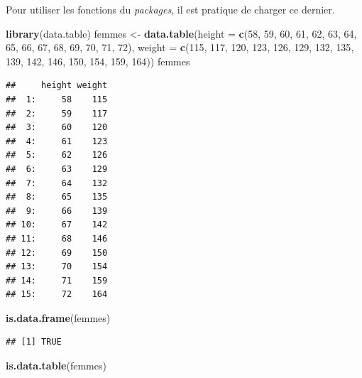 \documentclass[
  11pt,
]{book}
\newenvironment{Shaded}{\begin{snugshade}}{\end{snugshade}}
\newcommand{\DataTypeTok}[1]{\textcolor[rgb]{0.13,0.29,0.53}{#1}}
\newcommand{\DecValTok}[1]{\textcolor[rgb]{0.00,0.00,0.81}{#1}}
\newcommand{\KeywordTok}[1]{\textcolor[rgb]{0.13,0.29,0.53}{\textbf{#1}}}
\newcommand{\NormalTok}[1]{#1}
\newcommand{\StringTok}[1]{\textcolor[rgb]{0.31,0.60,0.02}{#1}}
\numberwithin{equation}{section}
\numberwithin{countremarque}{section}
\begin{document}
Pour utiliser les fonctions du \emph{packages}, il est pratique de charger ce dernier.

\begin{Shaded}
\begin{Highlighting}[]
\KeywordTok{library}\NormalTok{(data.table)}
\NormalTok{femmes \textless{}{-}}\StringTok{ }
\StringTok{  }\KeywordTok{data.table}\NormalTok{(}\DataTypeTok{height =} \KeywordTok{c}\NormalTok{(}\DecValTok{58}\NormalTok{, }\DecValTok{59}\NormalTok{, }\DecValTok{60}\NormalTok{, }\DecValTok{61}\NormalTok{, }\DecValTok{62}\NormalTok{, }\DecValTok{63}\NormalTok{, }\DecValTok{64}\NormalTok{, }\DecValTok{65}\NormalTok{, }\DecValTok{66}\NormalTok{, }
                        \DecValTok{67}\NormalTok{, }\DecValTok{68}\NormalTok{, }\DecValTok{69}\NormalTok{, }\DecValTok{70}\NormalTok{, }\DecValTok{71}\NormalTok{, }\DecValTok{72}\NormalTok{),}
           \DataTypeTok{weight =} \KeywordTok{c}\NormalTok{(}\DecValTok{115}\NormalTok{, }\DecValTok{117}\NormalTok{, }\DecValTok{120}\NormalTok{, }\DecValTok{123}\NormalTok{, }\DecValTok{126}\NormalTok{, }\DecValTok{129}\NormalTok{, }\DecValTok{132}\NormalTok{, }\DecValTok{135}\NormalTok{, }
                      \DecValTok{139}\NormalTok{, }\DecValTok{142}\NormalTok{, }\DecValTok{146}\NormalTok{, }\DecValTok{150}\NormalTok{, }\DecValTok{154}\NormalTok{, }\DecValTok{159}\NormalTok{, }\DecValTok{164}\NormalTok{))}
\NormalTok{femmes}
\end{Highlighting}
\end{Shaded}

\begin{lstlisting}
##     height weight
##  1:     58    115
##  2:     59    117
##  3:     60    120
##  4:     61    123
##  5:     62    126
##  6:     63    129
##  7:     64    132
##  8:     65    135
##  9:     66    139
## 10:     67    142
## 11:     68    146
## 12:     69    150
## 13:     70    154
## 14:     71    159
## 15:     72    164
\end{lstlisting}

\begin{Shaded}
\begin{Highlighting}[]
\KeywordTok{is.data.frame}\NormalTok{(femmes)}
\end{Highlighting}
\end{Shaded}

\begin{lstlisting}
## [1] TRUE
\end{lstlisting}

\begin{Shaded}
\begin{Highlighting}[]
\KeywordTok{is.data.table}\NormalTok{(femmes)}
\end{Highlighting}
\end{Shaded}
\end{document}
